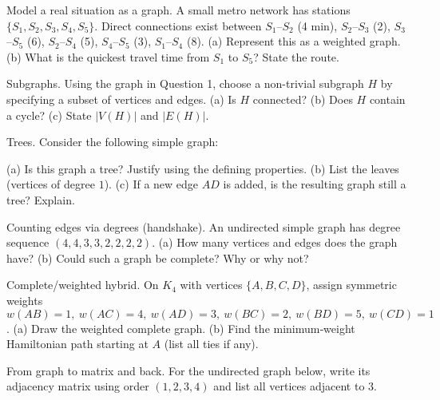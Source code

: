 \documentclass[11pt]{article}
\def\textbf#1{#1}%
\newcounter{question}
\begin{document}
\begin{question}
\textbf{Model a real situation as a graph.}
A small metro network has stations $\{S_1,S_2,S_3,S_4,S_5\}$. Direct connections exist between  
$S_1$–$S_2$ (4 min), $S_2$–$S_3$ (2), $S_3$–$S_5$ (6), $S_2$–$S_4$ (5), $S_4$–$S_5$ (3), $S_1$–$S_4$ (8).  
(a) Represent this as a weighted graph.  
(b) What is the quickest travel time from $S_1$ to $S_5$? State the route.
\end{question}

\begin{question}
\textbf{Subgraphs.}
Using the graph in Question 1, choose a non-trivial subgraph $H$ by specifying a subset of vertices and edges.  
(a) Is $H$ connected? (b) Does $H$ contain a cycle? (c) State $|V(H)|$ and $|E(H)|$.
\end{question}

\begin{question}
\textbf{Trees.}
Consider the following simple graph:
\begin{center}
\end{center}
(a) Is this graph a tree? Justify using the defining properties.  
(b) List the leaves (vertices of degree $1$).  
(c) If a new edge $AD$ is added, is the resulting graph still a tree? Explain.
\end{question}

\begin{question}
\textbf{Counting edges via degrees (handshake).}
An undirected simple graph has degree sequence $(4,4,3,3,2,2,2,2)$.  
(a) How many vertices and edges does the graph have?  
(b) Could such a graph be complete? Why or why not?
\end{question}

\begin{question}
\textbf{Complete/weighted hybrid.}
On $K_4$ with vertices $\{A,B,C,D\}$, assign symmetric weights  
$w(AB)=1,\ w(AC)=4,\ w(AD)=3,\ w(BC)=2,\ w(BD)=5,\ w(CD)=1$.  
(a) Draw the weighted complete graph.  
(b) Find the minimum‐weight Hamiltonian path starting at $A$ (list all ties if any).
\end{question}

\begin{question}
\textbf{From graph to matrix and back.}
For the undirected graph below, write its adjacency matrix using order $(1,2,3,4)$ and list all vertices adjacent to $3$.
\begin{center}
\end{center}
\end{question}
\end{document}

